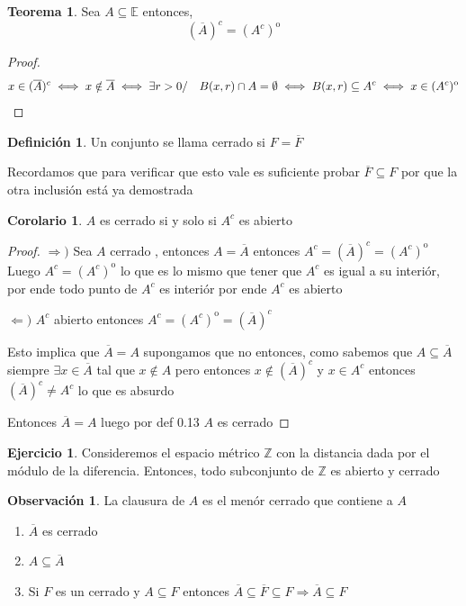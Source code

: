 \documentclass[12pt]{article}
\newcommand{\Z}{\mathbb{Z}}
\newcommand{\E}{\mathbb{E}}
\newcommand{\Ra}{\Rightarrow}
\newcommand{\ol}{\overline}
\newcommand{\open}{\mathrm{o}}
\theoremstyle{definition}
\newtheorem{definition}{Definición}[section]
\newtheorem*{remark}{Observación}
\newtheorem{theorem}{Teorema}
\newtheorem{corollary}{Corolario}[theorem]
\newtheorem{ej}{Ejercicio}
\begin{document}
\begin{theorem}
  Sea $A \subseteq \E$ entonces,
  $$ (\ol A)^c = (A^c)^{\open}$$

  \begin{proof}
  $$x \in (\ol A)^c \iff x \notin \ol A \iff \exists r>0  / \quad B(x,r) \cap A = \emptyset \iff B(x,r) \subseteq A^c 
  \\ \iff x \in (A^c)^{\open} $$
  \end{proof}
\end{theorem}

\begin{definition}
Un conjunto se llama cerrado si $F = \ol F$

Recordamos que para verificar que esto vale es suficiente probar $\ol F \subseteq F$ por que la otra inclusión está ya demostrada
\end{definition}

\newpage
\begin{corollary}
 $A$ es cerrado si y solo si $A^c $ es abierto

 \begin{proof}
 $\Rightarrow)$ Sea $A $ cerrado , entonces $A = \ol A$ entonces $A^c =(\ol A)^c = (A^{c})^{\open}$ Luego $A^c = (A^c)^{\open}$ lo que es lo mismo que tener que $A^c $ es igual a su interiór, por ende todo punto de $A^c$ es interiór por ende $A^c$ es abierto

$\Leftarrow)$ $A^c$ abierto entonces $A^c = (A^c)^{\open} = (\ol A)^c$ 

Esto implica que $\ol A = A$ supongamos que no entonces, como sabemos que $A \subseteq \ol A$ siempre $\exists x \in \ol A $ tal que $x \notin A$ pero entonces $x \notin (\ol A)^c$ y $x \in A^c$ entonces $(\ol A)^c \neq A^c$ lo que es absurdo

Entonces $\ol A = A$ luego por def 0.13 $A$ es cerrado
 \end{proof}
\end{corollary}

\begin{ej}
 Consideremos el espacio métrico $\Z$ con la distancia dada por el módulo de la diferencia. Entonces, todo subconjunto de $\Z$ es abierto y cerrado
\end{ej}

\begin{remark} La clausura de $A$ es el menór cerrado que contiene a $A$
  \begin{enumerate}
    \item $\ol A$ es cerrado
    \item $A \subseteq \ol A$
    \item Si $F$ es un cerrado y $A \subseteq F$ entonces $\ol A \subseteq \ol F \subseteq F \Ra \ol A \subseteq F$
  \end{enumerate}
\end{remark}
\end{document}
